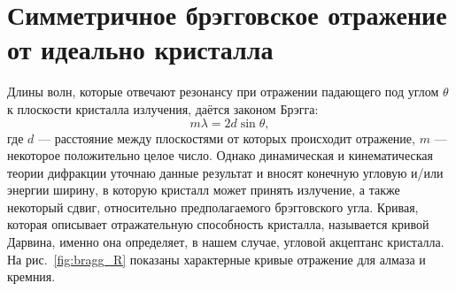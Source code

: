 \section{Симметричное брэгговское отражение от идеально кристалла}\label{diamond cry absorb}
Длины волн, которые отвечают резонансу при отражении падающего под углом $\theta$ к плоскости кристалла излучения, даётся законом Брэгга:  
\begin{equation}
	m\lambda = 2d\sin\theta,
\end{equation}
где $d$ --- расстояние между плоскостями от которых происходит отражение, $m$ --- некоторое положительно целое число. Однако динамическая и кинематическая теории дифракции уточнаю данные результат и вносят конечную угловую и/или энергии ширину, в которую кристалл может принять излучение, а также некоторый сдвиг, относительно предполагаемого брэгговского угла. Кривая, которая описывает отражательную способность кристалла, называется кривой Дарвина, именно она определяет, в нашем случае, угловой акцептанс кристалла. На рис.~\ref{fig:bragg_R} показаны характерные кривые отражение для алмаза и кремния. 
